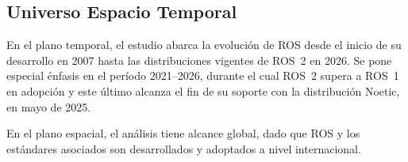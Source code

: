 \subsection{Universo Espacio Temporal}
En el plano temporal, el estudio abarca la evolución de ROS desde el inicio de
su desarrollo en 2007 hasta las distribuciones vigentes de ROS~2 en 2026. Se
pone especial énfasis en el período 2021--2026, durante el cual ROS~2 supera a
ROS~1 en adopción y este último alcanza el fin de su soporte con la
distribución Noetic, en mayo de 2025.

En el plano espacial, el análisis tiene alcance global, dado que ROS y los
estándares asociados son desarrollados y adoptados a nivel internacional.